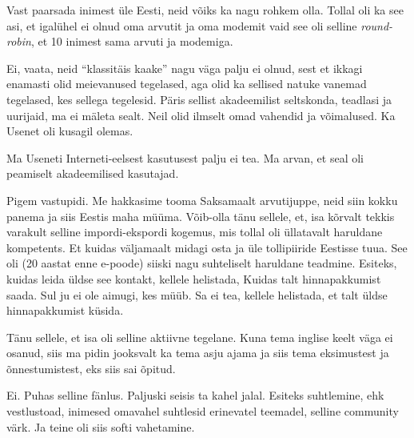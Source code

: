 
Vast paarsada inimest üle Eesti, neid võiks ka nagu rohkem olla. Tollal oli ka see asi, et igalühel ei olnud oma arvutit ja oma modemit vaid see oli selline \emph{round-robin}, et 10 inimest sama arvuti ja modemiga. 


Ei, vaata, neid \enquote{klassitäis kaake} nagu väga palju ei olnud, sest et ikkagi enamasti olid meievanused tegelased, aga olid ka sellised natuke vanemad tegelased, kes sellega tegelesid. Päris sellist akadeemilist seltskonda, teadlasi ja uurijaid, ma ei mäleta sealt. Neil olid ilmselt omad vahendid ja võimalused. Ka Usenet oli kusagil olemas.


Ma Useneti Interneti-eelsest kasutusest palju ei tea. Ma arvan, et seal oli peamiselt akadeemilised kasutajad.


Pigem vastupidi. Me hakkasime tooma Saksamaalt arvutijuppe, neid siin kokku panema ja siis Eestis maha müüma. Võib-olla tänu sellele, et, isa kõrvalt tekkis varakult selline impordi-ekspordi kogemus, mis tollal oli üllatavalt haruldane kompetents. Et kuidas väljamaalt midagi osta ja üle tollipiiride Eestisse tuua. See oli (20 aastat enne e-poode) siiski nagu suhteliselt haruldane teadmine. Esiteks, kuidas leida üldse see kontakt, kellele helistada, Kuidas talt hinnapakkumist saada. Sul ju ei ole aimugi, kes müüb. Sa ei tea, kellele helistada, et talt üldse hinnapakkumist küsida. 


Tänu sellele, et isa oli selline aktiivne tegelane. Kuna tema  inglise keelt väga ei osanud, siis ma pidin jooksvalt ka tema asju ajama ja siis tema eksimustest ja õnnestumistest, eks siis sai õpitud. 


Ei. Puhas selline fänlus. Paljuski seisis ta kahel jalal. Esiteks suhtlemine, ehk  vestlustoad, inimesed omavahel suhtlesid erinevatel teemadel, selline community värk. Ja teine oli siis softi vahetamine.

